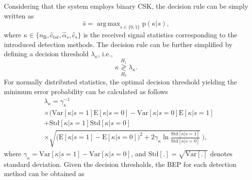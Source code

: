 \documentclass[twocolumn]{IEEEtran}
\newcommand{\p}{\mathrm{p}}
\newcommand{\B}{\mathrm{B}}
\newcommand{\E}{\mathrm{E}}
\newcommand{\Var}{\mathrm{Var}}
\newcommand{\Std}{\mathrm{Std}}
\DeclareMathOperator*{\argmax}{arg\,max}
\begin{document}
Considering that the system employs binary CSK, the decision rule can be simply written as
\begin{equation}
\hat{s} = \argmax_{s \in \{0,1\}} \p(\kappa|s),
\label{gaussian_DRBT2}
\end{equation}
where $\kappa \in \{n_\B, \hat{c}_{tot}, \hat{\alpha}_s, \hat{c}_s \}$ is the received signal statistics corresponding to the introduced detection methods. The decision rule can be further simplified by defining a decision threshold $\lambda_{\kappa}$, i.e.,
\begin{equation} 
\kappa \underset{{H_0}}{\overset{H_{1}}{\gtrless}} \lambda_{\kappa}.
\label{threshold}
\end{equation}
For normally distributed statistics, the optimal decision threshold yielding the minimum error probability can be calculated as follows
\begin{align} \label{threshold3}
& \lambda_{\kappa}  = \gamma_{\kappa}^{-1} \\ \nonumber
&\times  \Biggl( \Var[\kappa|s = 1] \E[\kappa|s = 0] -  \Var[\kappa|s = 0] \E[\kappa|s = 1]  \\ \nonumber
& + \Std[\kappa|s = 1]\Std[\kappa|s = 0] \\ \nonumber
& \times \sqrt{\bigl(\E[\kappa|s = 1] - \E[\kappa|s = 0] \bigr)^2+2 \gamma_{\kappa}  \ln{\frac{\Std[\kappa|s = 1]}{\Std[\kappa|s = 0]}}} ~\Biggr), 
\end{align}
where $\gamma_{\kappa} = \Var[\kappa|s = 1] - \Var[\kappa|s = 0]$, and $\Std[.] = \sqrt{\Var[.]}$ denotes standard deviation. Given the decision thresholds, the BEP for each detection method can be obtained as
\end{document}
